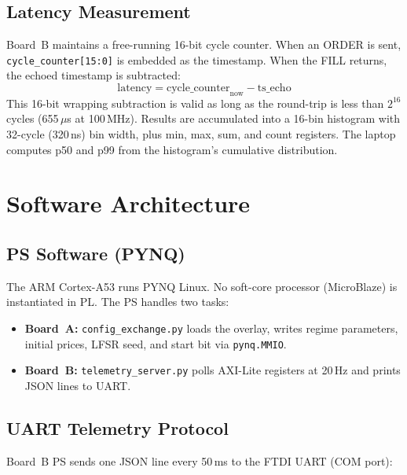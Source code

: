 \documentclass[conference]{IEEEtran}
\begin{document}
\subsection{Latency Measurement}

Board~B maintains a free-running 16-bit cycle counter. When an ORDER is sent, \texttt{cycle\_counter[15:0]} is embedded as the timestamp. When the FILL returns, the echoed timestamp is subtracted:
\begin{equation}
\text{latency} = \text{cycle\_counter}_{\text{now}} - \text{ts\_echo}
\end{equation}
This 16-bit wrapping subtraction is valid as long as the round-trip is less than $2^{16}$ cycles (655\,$\mu$s at 100\,MHz). Results are accumulated into a 16-bin histogram with 32-cycle (320\,ns) bin width, plus min, max, sum, and count registers. The laptop computes p50 and p99 from the histogram's cumulative distribution.

\section{Software Architecture}

\subsection{PS Software (PYNQ)}

The ARM Cortex-A53 runs PYNQ Linux. No soft-core processor (MicroBlaze) is instantiated in PL. The PS handles two tasks:

\begin{itemize}[noitemsep]
  \item \textbf{Board~A:} \texttt{config\_exchange.py} loads the overlay, writes regime parameters, initial prices, LFSR seed, and start bit via \texttt{pynq.MMIO}.
  \item \textbf{Board~B:} \texttt{telemetry\_server.py} polls AXI-Lite registers at 20\,Hz and prints JSON lines to UART.
\end{itemize}

\subsection{UART Telemetry Protocol}

Board~B PS sends one JSON line every 50\,ms to the FTDI UART (COM port):
\end{document}
